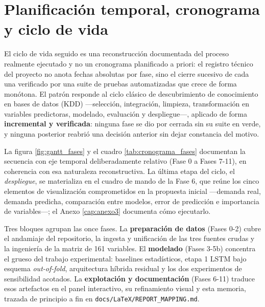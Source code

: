 \section{Planificación temporal, cronograma y ciclo de vida}\label{sec:planificacion}

El ciclo de vida seguido es una reconstrucción documentada del proceso realmente
ejecutado y no un cronograma planificado a priori: el registro técnico del proyecto no
anota fechas absolutas por fase, sino el cierre sucesivo de cada una verificado por una
suite de pruebas automatizadas que crece de forma monótona. El patrón responde al ciclo
clásico de descubrimiento de conocimiento en bases de datos (KDD) —selección,
integración, limpieza, transformación en variables predictoras, modelado, evaluación y
despliegue—, aplicado de forma \textbf{incremental y verificada}: ninguna fase se dio por
cerrada sin su suite en verde, y ninguna posterior reabrió una decisión anterior sin
dejar constancia del motivo.

La figura \ref{fig:gantt_fases} y el cuadro \ref{tab:cronograma_fases} documentan la
secuencia con eje temporal deliberadamente relativo (Fase 0 a Fases 7-11), en coherencia
con esa naturaleza reconstructiva. La última etapa del ciclo, el \emph{despliegue}, se
materializa en el cuadro de mando de la Fase 6, que reúne los cinco elementos de
visualización comprometidos en la propuesta inicial —demanda real, demanda predicha,
comparación entre modelos, error de predicción e importancia de variables—; el Anexo
\ref{cap:anexo3} documenta cómo ejecutarlo.

Tres bloques agrupan las once fases. La \textbf{preparación de datos} (Fases 0-2) cubre
el andamiaje del repositorio, la ingesta y unificación de las tres fuentes crudas y la
ingeniería de la matriz de 161 variables. El \textbf{modelado} (Fases 3-5b) concentra el
grueso del trabajo experimental: baselines estadísticos, etapa 1 LSTM bajo esquema
\emph{out-of-fold}, arquitectura híbrida residual y los dos experimentos de sensibilidad
acotados. La \textbf{explotación y documentación} (Fases 6-11) traduce esos artefactos en
el panel interactivo, su refinamiento visual y esta memoria, trazada de principio a fin
en \texttt{docs/\allowbreak{}LaTeX/\allowbreak{}REPORT\_MAPPING.md}.

